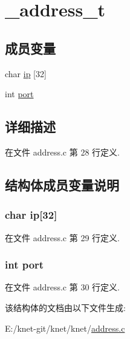 \hypertarget{struct__address__t}{}\section{\+\_\+address\+\_\+t}
\label{struct__address__t}
\subsection*{成员变量}
\begin{DoxyCompactItemize}
\item 
char \hyperlink{struct__address__t_a848707785cd2a28db680d6509c485f35}{ip} \mbox{[}32\mbox{]}
\item 
int \hyperlink{struct__address__t_a63c89c04d1feae07ca35558055155ffb}{port}
\end{DoxyCompactItemize}


\subsection{详细描述}


在文件 address.\+c 第 28 行定义.



\subsection{结构体成员变量说明}
\hypertarget{struct__address__t_a848707785cd2a28db680d6509c485f35}{}
\subsubsection[{ip}]{\setlength{\rightskip}{0pt plus 5cm}char ip\mbox{[}32\mbox{]}}\label{struct__address__t_a848707785cd2a28db680d6509c485f35}


在文件 address.\+c 第 29 行定义.

\hypertarget{struct__address__t_a63c89c04d1feae07ca35558055155ffb}{}
\subsubsection[{port}]{\setlength{\rightskip}{0pt plus 5cm}int port}\label{struct__address__t_a63c89c04d1feae07ca35558055155ffb}


在文件 address.\+c 第 30 行定义.



该结构体的文档由以下文件生成\+:\begin{DoxyCompactItemize}
\item 
E\+:/knet-\/git/knet/knet/\hyperlink{address_8c}{address.\+c}\end{DoxyCompactItemize}
